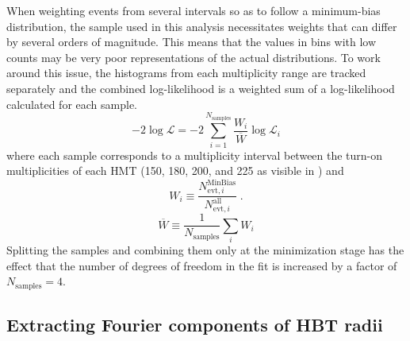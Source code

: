 When weighting events from several \Nch intervals so as to follow a minimum-bias distribution, the sample used in this analysis necessitates weights that can differ by several orders of magnitude.
This means that the values in bins with low counts may be very poor representations of the actual distributions.
To work around this issue, the histograms from each multiplicity range are tracked separately and the combined log-likelihood is a weighted sum of a log-likelihood calculated for each sample.
\begin{equation}
  -2\log\mathcal{L} = -2 \sum_{i=1}^{N_\textrm{samples}} \frac{W_i}{\overline{W}} \log\mathcal{L}_i
\end{equation}
where each sample corresponds to a multiplicity interval between the turn-on multiplicities of each \ac{HMT} (150, 180, 200, and 225 as visible in \Fig{\ref{fig:nch}}) and
\[
W_i \equiv \frac{N_{\textrm{evt},i}^\textrm{MinBias}}{N_{\textrm{evt},i}^\textrm{all}} \; .
\]
\[ \overline{W} \equiv \frac{1}{N_\textrm{samples}} \sum_i W_i \]
Splitting the samples and combining them only at the minimization stage has the effect that the number of degrees of freedom in the fit is increased by a factor of $N_\textrm{samples} = 4$.
\subsection{Extracting Fourier components of HBT radii}
\label{subsec:azi_correlations}

